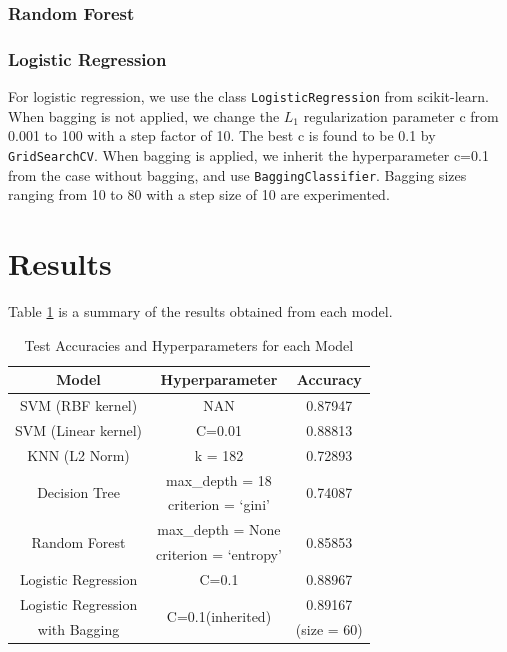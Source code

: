 \documentclass[10pt,twocolumn]{article}
\begin{document}
	\subsubsection{Random Forest}
	\subsubsection{Logistic Regression}
	For logistic regression, we use the class \texttt{LogisticRegression} from scikit-learn. When bagging is not applied, we change the $L_1$ regularization parameter c from 0.001 to 100 with a step factor of 10. The best c is found to be 0.1 by \texttt{GridSearchCV}. When bagging is applied, we inherit the hyperparameter c=0.1 from the case without bagging, and use \texttt{BaggingClassifier}. Bagging sizes ranging from 10 to 80 with a step size of 10 are experimented.  
	\section{Results}
	Table \ref{results} is a summary of the results obtained from each model. 
	\begin{table}[H]
		\begin{tabular}{|c|c|c|}
			\hline
			Model & Hyperparameter & Accuracy\\
			\hline 
			\hline
			SVM (RBF kernel) & NAN & 0.87947\\
			\hline
			SVM (Linear kernel) & C=0.01 & 0.88813\\
			\hline
			KNN (L2 Norm) & k = 182 & 0.72893\\
			\hline
			\multirow{2}{*}{Decision Tree}  & \small{max\_depth = 18} & \multirow{2}{*}{0.74087}\\
			& \small{criterion = ‘gini’} & \\
			\hline
			\multirow{2}{*}{Random Forest} & \small{max\_depth = None} & \multirow{2}{*}{0.85853}\\
			& \small{criterion = ‘entropy’}& \\
			\hline
			Logistic Regression & C=0.1 & 0.88967\\
			\hline
			Logistic Regression & \multirow{2}{*}{C=0.1(inherited)} & 0.89167 \\
			with Bagging & & (size = 60)\\
			\hline		
		\end{tabular}
		\caption{Test Accuracies and Hyperparameters for each Model}\label{results}
	\end{table}
\end{document}
